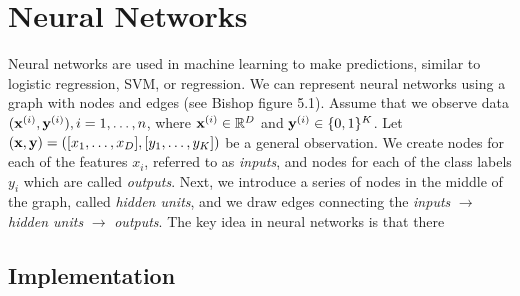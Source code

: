 
\section{Neural Networks}\label{sec:neural_networks}

Neural networks are used in machine learning to make predictions, similar to logistic regression, SVM, or regression.  We can represent neural networks using a graph with nodes and edges (see Bishop figure 5.1).  Assume that we observe data $(\boldsymbol{\mathbf{x}}^{(i)},\boldsymbol{\mathbf{y}}^{(i)}), i = 1, \ldots, n$,  where $\boldsymbol{\mathbf{x}}^{(i)} \in \mathbb{R}^D$ and $\boldsymbol{\mathbf{y}}^{(i)} \in \{0,1\}^K$.  Let $(\boldsymbol{\mathbf{x}},\boldsymbol{\mathbf{y}}) = ([x_1, \ldots, x_D],[y_1, \ldots, y_K])$ be a general observation.  We create nodes for each of the features $x_i$, referred to as \emph{inputs}, and nodes for each of the class labels $y_i$ which are called \emph{outputs}.  Next, we introduce a series of nodes in the middle of the graph, called \emph{hidden units}, and we draw edges connecting the\emph{ inputs} $\rightarrow$ \emph{hidden units} $\rightarrow$ \emph{outputs}.  The key idea in neural networks is that there 

\subsection{Implementation}

